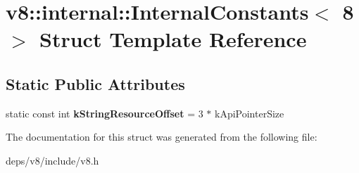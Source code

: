 \hypertarget{structv8_1_1internal_1_1_internal_constants_3_018_01_4}{}\section{v8\+:\+:internal\+:\+:Internal\+Constants$<$ 8 $>$ Struct Template Reference}
\label{structv8_1_1internal_1_1_internal_constants_3_018_01_4}
\subsection*{Static Public Attributes}
\begin{DoxyCompactItemize}
\item 
\hypertarget{structv8_1_1internal_1_1_internal_constants_3_018_01_4_a95faec00d49358d58aafd8cd10257e76}{}static const int {\bfseries k\+String\+Resource\+Offset} = 3 $\ast$ k\+Api\+Pointer\+Size\label{structv8_1_1internal_1_1_internal_constants_3_018_01_4_a95faec00d49358d58aafd8cd10257e76}

\end{DoxyCompactItemize}


The documentation for this struct was generated from the following file\+:\begin{DoxyCompactItemize}
\item 
deps/v8/include/v8.\+h\end{DoxyCompactItemize}
